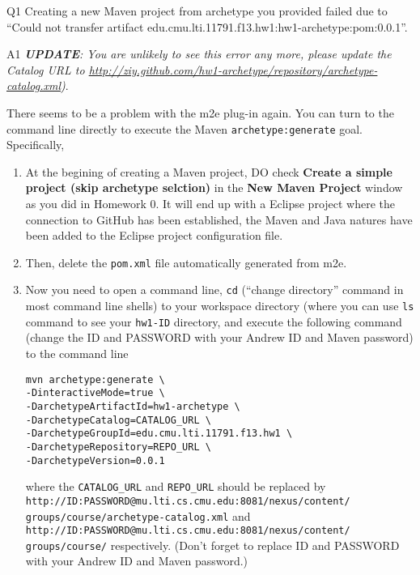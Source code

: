 \begin{qa}

\item[Q1] Creating a new Maven project from archetype you provided failed due to
``Could not transfer artifact
edu.cmu.lti.11791.f13.hw1:hw1-archetype:pom:0.0.1''.

\item[A1] \emph{\textbf{UPDATE}: You are unlikely to see this error any more,
please update the Catalog URL to
\url{http://ziy.github.com/hw1-archetype/repository/archetype-catalog.xml})}.

There seems to be a problem with the m2e plug-in again. You can turn to the
command line directly to execute the Maven \texttt{archetype:generate} goal.
Specifically,

\begin{enumerate}

\item At the begining of creating a Maven project, DO check
\textbf{Create a simple project (skip archetype selction)} in the \textbf{New Maven Project}
window as you did in Homework 0. It will end up with a Eclipse project where the
connection to GitHub has been established, the Maven and Java natures have been
added to the Eclipse project configuration file.

\item Then, delete the \verb|pom.xml| file automatically generated from m2e.

\item Now you need to open a command line, \verb|cd| (``change directory'' command in
most command line shells) to your workspace directory (where you can use
\verb|ls| command to see your \verb|hw1-ID| directory, and execute the following
command (change the ID and PASSWORD with your Andrew ID and Maven password) to
the command line

\small
\begin{verbatim}
mvn archetype:generate \
-DinteractiveMode=true \
-DarchetypeArtifactId=hw1-archetype \
-DarchetypeCatalog=CATALOG_URL \
-DarchetypeGroupId=edu.cmu.lti.11791.f13.hw1 \
-DarchetypeRepository=REPO_URL \
-DarchetypeVersion=0.0.1
\end{verbatim}
\normalsize

where the \verb|CATALOG_URL| and \verb|REPO_URL| should be replaced by
\verb|http://ID:PASSWORD@mu.lti.cs.cmu.edu:8081/nexus/content/|
\verb|groups/course/archetype-catalog.xml| and
\verb|http://ID:PASSWORD@mu.lti.cs.cmu.edu:8081/nexus/content/|
\verb|groups/course/| respectively. (Don't forget to replace ID and PASSWORD
with your Andrew ID and Maven password.)


\end{enumerate}
\end{qa}
